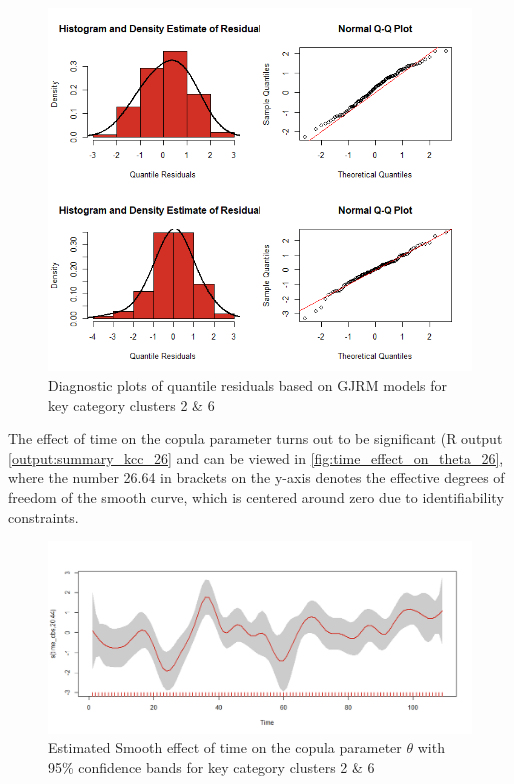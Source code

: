 


\begin{figure}[H]
\centering
  \includegraphics[width=0.95\linewidth]{figures/res_hist_qqplot_26.png}
  \caption{Diagnostic plots of quantile residuals based on \ac{GJRM} models for key category clusters 2 \& 6}
  \label{fig:res_hist_qqplot_26}
\end{figure}



The effect of time on the copula parameter turns out to be significant (R output \ref{output:summary_kcc_26} and can be viewed in \autoref{fig:time_effect_on_theta_26}, where the number 26.64 in brackets on the y-axis denotes the effective degrees of freedom of the smooth curve, which is centered around zero due to identifiability constraints.
\\

\begin{figure}[H]
\centering
  \includegraphics[width=0.95\linewidth]{figures/time_effect_on_theta_26.png}
  \caption{Estimated Smooth effect of time on the copula parameter $\theta$ with 95\% confidence bands for key category clusters 2 \& 6}
  \label{fig:time_effect_on_theta_26}
\end{figure}



